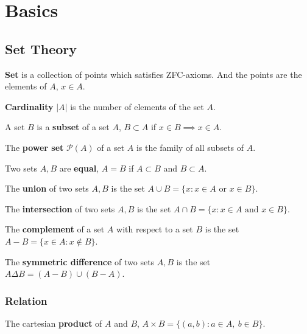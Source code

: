 \chapter{Basics}
\section{Set Theory}
\textbf{Set} is a collection of points which satisfies ZFC-axioms.
And the points are the elements of $A$, $x \in A$.

\begin{definition}
	\textbf{Cardinality} $|A|$ is the number of elements of the set $A$.
\end{definition}

\begin{definition}
	A set $B$ is a \textbf{subset} of a set $A$, $B \subset A$ if $x \in B \implies x \in A$.
\end{definition}

\begin{definition}
	The \textbf{power set} $\mathcal{P}(A)$ of a set $A$ is the family of all subsets of $A$.
\end{definition}

\begin{definition}
	Two sets $A,B$ are \textbf{equal}, $A = B$ if $A \subset B$ and $B \subset A$.
\end{definition}

\begin{definition}
	The \textbf{union} of two sets $A,B$ is the set $A \cup B = \{ x : x \in A \text{ or } x \in B\}$.
\end{definition}

\begin{definition}
	The \textbf{intersection} of two sets $A,B$ is the set $A \cap B = \{ x : x \in A \text{ and } x \in B\}$.
\end{definition}

\begin{definition}
	The \textbf{complement} of a set $A$ with respect to a set $B$ is the set $A-B = \{ x \in A : x \notin B\}$.
\end{definition}

\begin{definition}
	The \textbf{symmetric difference} of two sets $A,B$ is the set $A \Delta B = (A-B) \cup (B-A)$.
\end{definition}

\subsection{Relation}
\begin{definition}
	The cartesian \textbf{product} of $A$ and $B$, $A \times B = \{ (a,b) : a \in A,\ b \in B\}$.
\end{definition}

